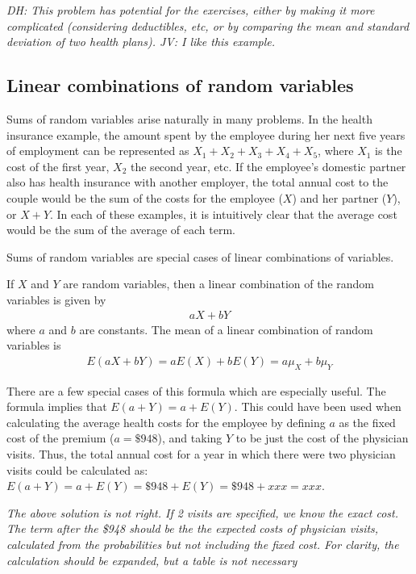 \textit{DH: This problem has potential for the exercises, either by making it more complicated (considering deductibles, etc, or by comparing the mean and standard deviation of two health plans). JV: I like this example.}

\subsection{Linear combinations of random variables}

Sums of random variables arise naturally in many problems. In the health insurance example, the amount spent by the employee during her next five years of employment can be represented as $X_1 + X_2 + X_3 + X_4 + X_5$, where $X_1$ is the cost of the first year, $X_2$ the second year, etc. If the employee's domestic partner also has health insurance with another employer, the total annual cost to the couple would be the sum of the costs for the employee ($X$) and her partner ($Y$), or $X + Y$. In each of these examples, it is intuitively clear that the average cost would be the sum of the average of each term.

Sums of random variables are special cases of linear combinations of variables.  

\begin{termBox}{
If $X$ and $Y$ are random variables, then a linear combination of the random variables is given by
\begin{align}\label{linComboOfRandomVariablesXAndY}
aX + bY
\end{align}
where $a$ and $b$ are constants.  The mean of a linear combination of random variables is 
\begin{align*}
 E(aX + bY) = aE(X) + bE(Y) = a\mu_X + b\mu_Y
\end{align*}}
\end{termBox}

There are a few special cases of this formula which are especially useful. The formula implies that $E(a + Y) = a + E(Y)$.  This could have been used when calculating the average health costs for the employee by defining $a$ as the fixed cost of the premium ($a=\$948$), and taking $Y$ to be just the cost of the physician visits. Thus, the total annual cost for a year in which there were two physician visits could be calculated as: $E(a + Y) = a + E(Y) = \$948 + E(Y) = \$948 + xxx = xxx$. 

\textit{The above solution is not right.  If 2 visits are specified, we know the exact cost. The term after the \$948 should be the the expected costs of physician visits, calculated from the probabilities but not including the fixed cost. For clarity, the calculation should be expanded, but a table is not necessary}

